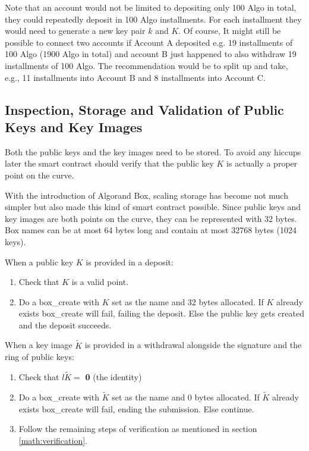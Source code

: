 \documentclass[9pt]{article}
\begin{document}
Note that an account would not be limited to depositing only 100 Algo in total, they could repeatedly deposit in 100 Algo installments. For each installment they would need to generate a new key pair $k$ and $K$. Of course, It might still be possible to connect two accounts if Account A deposited e.g. 19 installments of 100 Algo (1900 Algo in total) and account B just happened to also withdraw 19 installments of 100 Algo. The recommendation would be to split up and take, e.g., 11 installments into Account B and 8 installments into Account C. 

\subsection{Inspection, Storage and Validation of Public Keys and Key Images}

Both the public keys and the key images need to be stored. To avoid any hiccups later the smart contract should verify that the public key $K$ is actually a proper point on the curve.

With the introduction of Algorand Box, scaling storage has become not much simpler but also made this kind of smart contract possible. Since public keys and key images are both points on the curve, they can be represented with 32 bytes. Box names can be at most 64 bytes long and contain at most 32768 bytes (1024 keys).

When a public key $K$ is provided in a deposit:
\begin{enumerate}
    \item Check that $K$ is a valid point.
    \item Do a box\_create with $K$ set as the name and 32 bytes allocated. If $K$ already exists box\_create will fail, failing the deposit. Else the public key gets created and the deposit succeeds.
\end{enumerate}

When a key image $\tilde{K}$ is provided in a withdrawal alongside the signature and the ring of public keys:
\begin{enumerate}
    \item Check that $l\tilde{K} =$ \textbf{0} (the identity)
    \item Do a box\_create with $\tilde{K}$ set as the name and 0 bytes allocated. If $\tilde{K}$ already exists box\_create will fail, ending the submission. Else continue.
    \item Follow the remaining steps of verification as mentioned in section \ref{math:verification}.
\end{enumerate}
\end{document}
